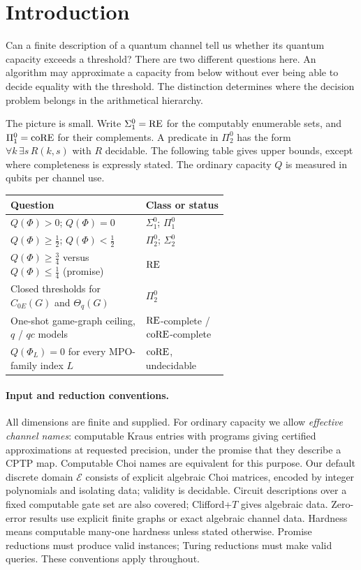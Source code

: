 \section{Introduction}\label{sec:intro}
Can a finite description of a quantum channel tell us whether its quantum
capacity exceeds a threshold? There are two different questions here. An
algorithm may approximate a capacity from below without ever being able to
decide equality with the threshold. The distinction determines where the
decision problem belongs in the arithmetical hierarchy.

The picture is small. Write $\Sigma^0_1=\mathrm{RE}$ for the computably enumerable
sets, and $\Pi^0_1=\mathrm{coRE}$ for their complements. A predicate in $\Pi^0_2$
has the form $\forall k\,\exists s\,R(k,s)$ with $R$ decidable. The following
table gives upper bounds, except where completeness is expressly stated.
The ordinary capacity $Q$ is measured in qubits per channel use.
\begin{center}
\small
\begin{tabular}{p{0.62\linewidth}l}
\hline
Question & Class or status\\ \hline
$Q(\Phi)>0$; $Q(\Phi)=0$ & $\Sigma^0_1$; $\Pi^0_1$\\
$Q(\Phi)\geq\tfrac12$; $Q(\Phi)<\tfrac12$ & $\Pi^0_2$; $\Sigma^0_2$\\
$Q(\Phi)\geq\tfrac34$ versus $Q(\Phi)\leq\tfrac14$ (promise) & $\mathrm{RE}$~\cite{BMZ}\\
Closed thresholds for $C_{0E}(G)$ and $\Theta_q(G)$ & $\Pi^0_2$\\
One-shot game-graph ceiling, $q$ / $qc$ models & $\mathrm{RE}$-complete / $\mathrm{coRE}$-complete\\
$Q(\Phi_L)=0$ for every MPO-family index $L$ & $\mathrm{coRE}$, undecidable\\
\hline
\end{tabular}
\end{center}

\paragraph{Input and reduction conventions.}
All dimensions are finite and supplied. For ordinary capacity we allow
\emph{effective channel names}: computable Kraus entries with programs
giving certified approximations at requested precision, under the promise
that they describe a CPTP map. Computable Choi names are equivalent for
this purpose. Our default discrete domain $\mathcal E$ consists of explicit
algebraic Choi matrices, encoded by integer polynomials and isolating data;
validity is decidable. Circuit descriptions over a fixed computable gate
set are also covered; Clifford+$T$ gives algebraic data. Zero-error results
use explicit finite graphs or exact algebraic channel data. Hardness means
computable many-one hardness unless stated otherwise. Promise reductions
must produce valid instances; Turing reductions must make valid queries.
These conventions apply throughout.

